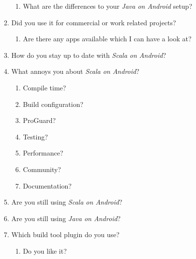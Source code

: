\begin{enumerate}
\begin{enumerate}
		\begin{enumerate}

			\item What are the differences to your \textit{Java on Android} setup?

		\end{enumerate}

		\item Did you use it for commercial or work related projects?

		\begin{enumerate}

			\item Are there any apps available which I can have a look at?

		\end{enumerate}

		\item How do you stay up to date with \textit{Scala on Android}?

		\item What annoys you about \textit{Scala on Android}?

		\begin{enumerate}

			\item Compile time?

			\item Build configuration?

			\item ProGuard?

			\item Testing?

			\item Performance?

			\item Community?

			\item Documentation?

		\end{enumerate}

		\item Are you still using \textit{Scala on Android}?

		\item Are you still using \textit{Java on Android}?

		\item Which build tool plugin do you use?

		\begin{enumerate}

			\item Do you like it?


\end{enumerate}
\end{enumerate}
\end{enumerate}
